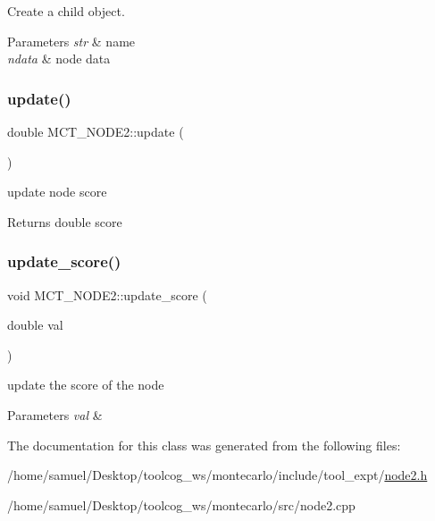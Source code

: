 Create a child object. 


\begin{DoxyParams}{Parameters}
{\em str} & name \\
\hline
{\em ndata} & node data \\
\hline
\end{DoxyParams}
\mbox{\label{classMCT__NODE2_a02b11b2ef3bc916dc8bb7fec7f475ca7}} 
\subsubsection{\texorpdfstring{update()}{update()}}
{\footnotesize\ttfamily double M\+C\+T\+\_\+\+N\+O\+D\+E2\+::update (\begin{DoxyParamCaption}{ }\end{DoxyParamCaption})}



update node score 

\begin{DoxyReturn}{Returns}
double score 
\end{DoxyReturn}
\mbox{\label{classMCT__NODE2_a7e14b83901a94e54e3ef87aa012078de}} 
\subsubsection{\texorpdfstring{update\+\_\+score()}{update\_score()}}
{\footnotesize\ttfamily void M\+C\+T\+\_\+\+N\+O\+D\+E2\+::update\+\_\+score (\begin{DoxyParamCaption}\item[{double}]{val }\end{DoxyParamCaption})\hspace{0.3cm}{\ttfamily [private]}}



update the score of the node 


\begin{DoxyParams}{Parameters}
{\em val} & \\
\hline
\end{DoxyParams}


The documentation for this class was generated from the following files\+:\begin{DoxyCompactItemize}
\item 
/home/samuel/\+Desktop/toolcog\+\_\+ws/montecarlo/include/tool\+\_\+expt/\hyperlink{node2_8h}{node2.\+h}\item 
/home/samuel/\+Desktop/toolcog\+\_\+ws/montecarlo/src/node2.\+cpp\end{DoxyCompactItemize}
